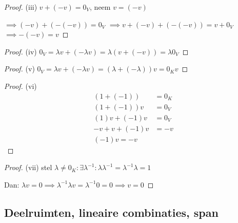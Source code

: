 \begin{proof}(iii)
        \(v + (-v) = 0_V\), neem \(v = (-v)\)

        \(\implies (-v) + (-(-v)) = 0_V\)
        \(\implies  v + (-v) + (-(-v)) = v + 0_V \)
        \(\implies -(-v) = v\)
\end{proof}
\begin{proof}(iv)
    \(
        0_V
        = \lambda v + (- \lambda v)
        = \lambda(v + (-v))
        = \lambda 0_V
    \)
\end{proof}
\begin{proof}(v)
    \(
        0_V
        = \lambda v + (- \lambda v)
        = (\lambda + (-\lambda))v
        =  0_K v
    \)
\end{proof}
\begin{proof}(vi)
    \begin{align*}
        (1 + (-1)) &= 0_K \\
        (1 + (-1))v &= 0_V \\
        (1)v + (-1)v &= 0_V \\
        -v + v + (-1)v &= -v \\
        (-1)v = -v
    \end{align*}
\end{proof}
\begin{proof}(vii)
    stel \(\lambda \neq 0_K: \exists \lambda^{-1}: \lambda \lambda^{-1} = \lambda^{-1} \lambda = 1\)

    Dan:
    \(\lambda v = 0
    \implies \lambda^{-1}\lambda v = \lambda^{-1}0 = 0
        \implies v = 0
    \)
\end{proof}

\subsection{Deelruimten, lineaire combinaties, span}

